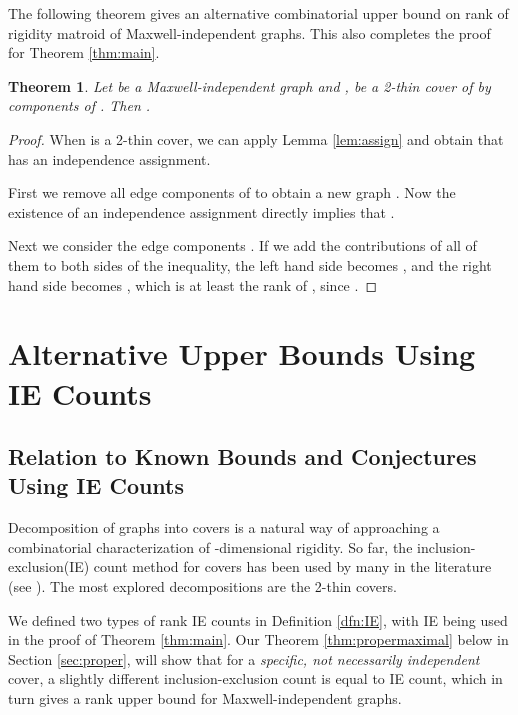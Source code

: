 \documentclass[10pt]{article}
\newtheorem{thm}{Theorem}
\begin{document}
The following theorem gives an alternative combinatorial upper bound on rank of rigidity matroid of Maxwell-independent graphs. This also completes the proof for Theorem \ref{thm:main}.

\begin{thm}\label{thm:weakrankIE}
Let  be a Maxwell-independent graph and ,  be a 2-thin cover of  by components of . Then .


\end{thm}
\begin{proof}

When  is a 2-thin cover, we can apply Lemma \ref{lem:assign} and obtain that  has an independence assignment.

First we remove all edge components of  to obtain a new graph . Now the existence of an independence assignment directly implies that      .


Next we consider the edge components . If we add the contributions of all of them to both sides of the inequality, the left hand side becomes , and the right hand side becomes  , which is at least the rank of , since    .

\end{proof}









\section{Alternative Upper Bounds Using IE Counts}\label{betterbound}
\subsection{Relation to Known Bounds and Conjectures Using IE Counts}\label{sec:knownbounds}
\noindent Decomposition of graphs into covers is a natural way of approaching a combinatorial characterization of -dimensional rigidity. So far, the
inclusion-exclusion(IE) count method for covers has been used by many in the
literature (see \cite{crapo:structuralRigidity:1979, sitharam:zhou:tractableADG:2004, andrewThesis, bib:survey, lovasz:yemini, JacksonJordansparse:2005, JacksonJordanrank:2006}). The most explored decompositions are the 2-thin covers.

\medskip\noindent
We defined two types of rank IE counts in Definition \ref{dfn:IE}, with IE being used in the proof of Theorem \ref{thm:main}. Our Theorem \ref{thm:propermaximal} below in Section \ref{sec:proper}, will show that for a {\em specific, not necessarily independent} cover, a slightly different inclusion-exclusion count is equal to IE count, which in turn gives a rank upper bound for Maxwell-independent graphs. 
\end{document}
